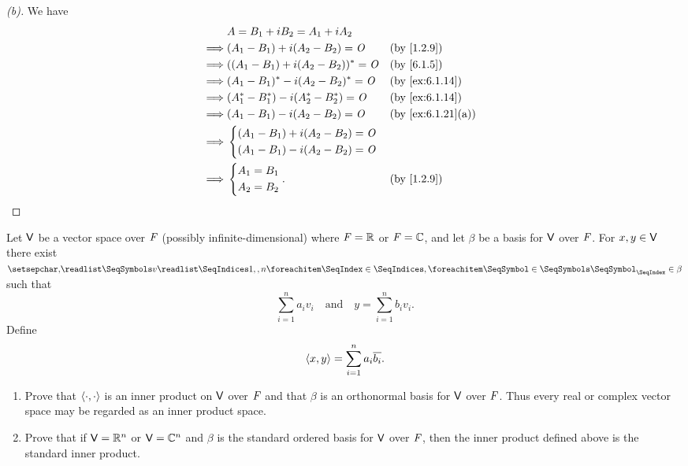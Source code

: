 \begin{proof}[(b)]
  We have
  \begin{align*}
             & A = B_1 + i B_2 = A_1 + i A_2                                                  \\
    \implies & (A_1 - B_1) + i (A_2 - B_2) = \zm         &  & \text{(by \cref{1.2.9})}        \\
    \implies & ((A_1 - B_1) + i (A_2 - B_2))^* = \zm     &  & \text{(by \cref{6.1.5})}        \\
    \implies & (A_1 - B_1)^* - i (A_2 - B_2)^* = \zm     &  & \text{(by \cref{ex:6.1.14})}    \\
    \implies & (A_1^* - B_1^*) - i (A_2^* - B_2^*) = \zm &  & \text{(by \cref{ex:6.1.14})}    \\
    \implies & (A_1 - B_1) - i (A_2 - B_2) = \zm         &  & \text{(by \cref{ex:6.1.21}(a))} \\
    \implies & \begin{dcases}
                 (A_1 - B_1) + i (A_2 - B_2) = \zm \\
                 (A_1 - B_1) - i (A_2 - B_2) = \zm
               \end{dcases}                                              \\
    \implies & \begin{dcases}
                 A_1 = B_1 \\
                 A_2 = B_2
               \end{dcases}.                            &  & \text{(by \cref{1.2.9})}
  \end{align*}
\end{proof}

\begin{ex}\label{ex:6.1.22}
  Let \(\mathsf{V}\) be a vector space over \(\mathit{F}\) (possibly infinite-dimensional) where \(\mathit{F} = \mathbb{R}\) or \(\mathit{F} = \mathbb{C}\), and let \(\beta\) be a basis for \(\mathsf{V}\) over \(\mathit{F}\).
  For \(x, y \in \mathsf{V}\) there exist \(\seq{v}{1,,n} \in \beta\) such that
  \[
    \sum_{i = 1}^n a_i v_i \quad \text{and} \quad y = \sum_{i = 1}^n b_i v_i.
  \]
  Define
  \[
    \left\langle x, y\right\rangle = \sum_{i = 1}^n a_i \overline{b_i}.
  \]
  \begin{enumerate}
    \item Prove that \(\left\langle\cdot, \cdot\right\rangle\) is an inner product on \(\mathsf{V}\) over \(\mathit{F}\) and that \(\beta\) is an orthonormal basis for \(\mathsf{V}\) over \(\mathit{F}\).
          Thus every real or complex vector space may be regarded as an inner product space.
    \item Prove that if \(\mathsf{V} = \mathbb{R}^n\) or \(\mathsf{V} = \mathbb{C}^n\) and \(\beta\) is the standard ordered basis for \(\mathsf{V}\) over \(\mathit{F}\), then the inner product defined above is the standard inner product.
  \end{enumerate}
\end{ex}

